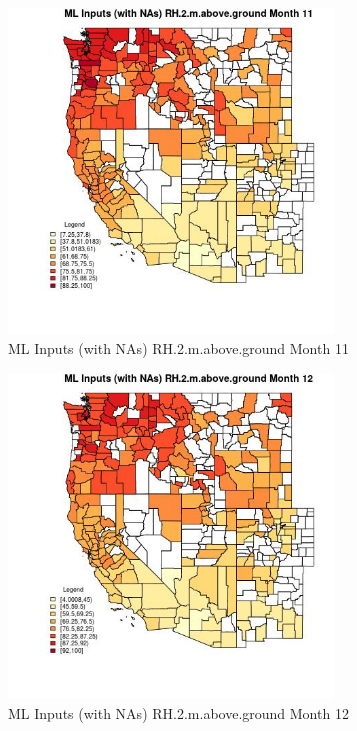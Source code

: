 \clearpage 

\begin{figure} 
\centering  
\includegraphics[width=0.77\textwidth]{Code_Outputs/Report_ML_input_PM25_Step4_part_e_de_duplicated_aves_compiled_2019-05-21wNAs_CountyRH2mabovegroundmedianMonth11.jpg} 
\caption{\label{fig:Report_ML_input_PM25_Step4_part_e_de_duplicated_aves_compiled_2019-05-21wNAsCountyRH2mabovegroundmedianMonth11}ML Inputs (with NAs) RH.2.m.above.ground Month 11} 
\end{figure} 
 

\begin{figure} 
\centering  
\includegraphics[width=0.77\textwidth]{Code_Outputs/Report_ML_input_PM25_Step4_part_e_de_duplicated_aves_compiled_2019-05-21wNAs_CountyRH2mabovegroundmedianMonth12.jpg} 
\caption{\label{fig:Report_ML_input_PM25_Step4_part_e_de_duplicated_aves_compiled_2019-05-21wNAsCountyRH2mabovegroundmedianMonth12}ML Inputs (with NAs) RH.2.m.above.ground Month 12} 
\end{figure} 
 


